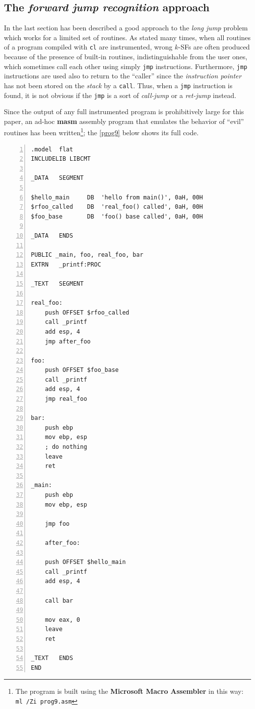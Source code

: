\documentclass[a4paper,10pt]{report}
\begin{document}
\subsection{The \emph{forward jump recognition} approach}

In the last section has been described a good approach to the \emph{long jump} problem
which works for a limited set of routines. As stated many times, when
all routines of a program compiled with \verb|cl| are instrumented, wrong $k$-SFs
are often produced because of the presence of built-in routines, indistinguishable
from the user ones, which sometimes call each other using simply \verb|jmp| instructions.
Furthermore, \verb|jmp| instructions are used also to return to the ``caller'' 
since the \emph{instruction pointer} has not been stored on the \emph{stack}
by a \verb|call|. Thus, when a \verb|jmp| instruction is found, it is not obvious
if the \verb|jmp| is a sort of \emph{call-jump} or a \emph{ret-jump} instead.

Since the output of any full instrumented program is prohibitively large
for this paper, an ad-hoc \textbf{masm} assembly program that emulates the behavior 
of ``evil'' routines has been written\footnote{The program is built using
the \textbf{Microsoft Macro Assembler} in this way: \texttt{ml /Zi prog9.asm}}; 
the \cref{prog9} below shows its full code.

\begin{lstlisting}[language={[x86masm]Assembler}, 
	label=prog9, caption={prog9.asm, a tricky program}, frame=leftline, 
numbers=left, showstringspaces=false, deletekeywords={ah}]
.model	flat
INCLUDELIB LIBCMT

_DATA	SEGMENT

$hello_main		DB	'hello from main()', 0aH, 00H
$rfoo_called	DB	'real_foo() called', 0aH, 00H
$foo_base		DB	'foo() base called', 0aH, 00H

_DATA	ENDS

PUBLIC _main, foo, real_foo, bar
EXTRN	_printf:PROC

_TEXT	SEGMENT

real_foo:
	push OFFSET $rfoo_called
	call _printf
	add esp, 4
	jmp after_foo

foo:
	push OFFSET $foo_base
	call _printf
	add esp, 4
	jmp real_foo

bar:
	push ebp
	mov ebp, esp
	; do nothing
	leave
	ret

_main:	
	push ebp
	mov ebp, esp

	jmp foo
	
	after_foo:

	push OFFSET $hello_main
	call _printf
	add esp, 4

	call bar

	mov eax, 0
	leave
	ret

_TEXT	ENDS
END

\end{lstlisting}
\end{document}
